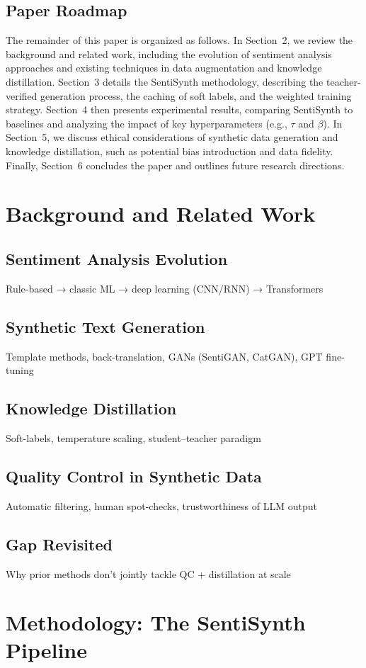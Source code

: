 \documentclass[11pt]{article}
\begin{document}
\subsection{Paper Roadmap}
The remainder of this paper is organized as follows. In Section~2, we
review the background and related work, including the evolution of
sentiment analysis approaches and existing techniques in data
augmentation and knowledge distillation. Section~3 details the
SentiSynth methodology, describing the teacher-verified generation
process, the caching of soft labels, and the weighted training
strategy. Section~4 then presents experimental results, comparing
SentiSynth to baselines and analyzing the impact of key
hyperparameters (e.g., $\tau$ and $\beta$). In Section~5, we discuss
ethical considerations of synthetic data generation and knowledge
distillation, such as potential bias introduction and data fidelity.
Finally, Section~6 concludes the paper and outlines future research directions.

\section{Background and Related Work}
\subsection{Sentiment Analysis Evolution}
Rule-based → classic ML → deep learning (CNN/RNN) → Transformers
\subsection{Synthetic Text Generation}
Template methods, back-translation, GANs (SentiGAN, CatGAN), GPT fine-tuning
\subsection{Knowledge Distillation}
Soft-labels, temperature scaling, student–teacher paradigm
\subsection{Quality Control in Synthetic Data}
Automatic filtering, human spot-checks, trustworthiness of LLM output
\subsection{Gap Revisited}
Why prior methods don't jointly tackle QC + distillation at scale

\section{Methodology: The SentiSynth Pipeline}
\end{document}
